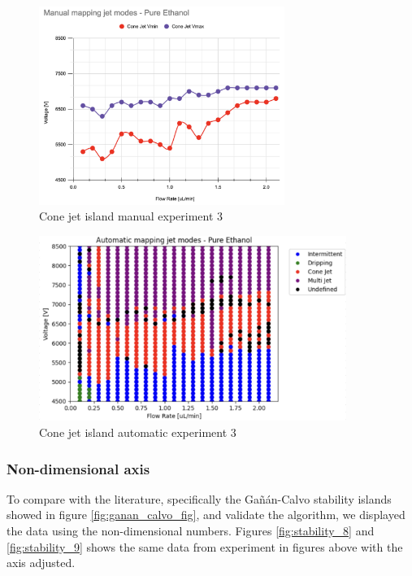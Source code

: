     \begin{multicols}{2}


        \begin{figure}[H]
            \center
            \includegraphics[width=8cm]{Figuras/april/map5.png}
            \caption{Cone jet island manual experiment 3}
            \label{fig:stability_6}
        \end{figure}

        \begin{figure}[H]
            \center
            \includegraphics[width=10cm]{Figuras/april/map2.png}
            \caption{Cone jet island automatic experiment 3}
            \label{fig:stability_7}
        \end{figure}


    \end{multicols}

    \vspace{2cm}
    \subsubsection{Non-dimensional axis}


    To compare with the literature, specifically the Gañán-Calvo\cite{gananCalvo} stability islands showed in figure \ref{fig:ganan_calvo_fig}, and validate the algorithm, we displayed the data using the non-dimensional numbers.
    Figures \ref{fig:stability_8} and \ref{fig:stability_9} shows the same data from experiment in figures above with the axis adjusted.

